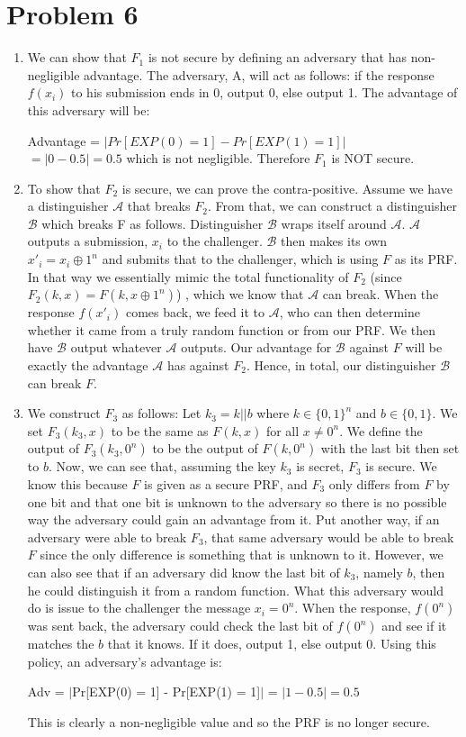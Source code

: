 \documentclass{article}
\begin{document}
\section*{Problem 6}
\begin{enumerate}
\item %
We can show that $F_1$ is not secure by defining an adversary that has non-negligible advantage. The adversary, A, will act as follows: if the response $f(x_i)$ to his submission ends in 0, output 0, else output 1. The advantage of this adversary will be:

Advantage = $|Pr[EXP(0) = 1] - Pr[EXP(1) = 1]|$
\\
$= |0 - 0.5| = 0.5$ which is not negligible. Therefore $F_1$ is NOT secure.

\item %
To show that $F_2$ is secure, we can prove the contra-positive. Assume we have a distinguisher $\mathcal{A}$ that breaks $F_2$. From that, we can construct a distinguisher $\mathcal{B}$ which breaks F as follows. Distinguisher $\mathcal{B}$ wraps itself around $\mathcal{A}$. $\mathcal{A}$ outputs a submission, $x_i$ to the challenger. $\mathcal{B}$ then makes its own $x'_i = x_i \oplus 1^n$ and submits that to the challenger, which is using $F$ as its PRF. In that way we essentially mimic the total functionality of $F_2$ (since $F_2(k, x) = F(k, x\oplus1^n)$) , which we know that $\mathcal{A}$ can break. When the response $f(x'_i)$ comes back, we feed it to $\mathcal{A}$, who can then determine whether it came from a truly random function or from our PRF. We then have $\mathcal{B}$ output whatever $\mathcal{A}$ outputs. Our advantage for $\mathcal{B}$ against $F$ will be exactly the advantage $\mathcal{A}$ has against $F_2$. Hence, in total, our distinguisher $\mathcal{B}$ can break $F$.
\item %
We construct $F_3$ as follows: Let $k_3 = k||b$ where $k \in \{0, 1\}^n$ and $b \in \{0, 1\}$. We set $F_3(k_3, x)$ to be the same as $F(k, x)$ for all $x \neq 0^n$. We define the output of $F_3 (k_3, 0^n)$ to be the output of $F(k, 0^n)$ with the last bit then set to $b$. 
Now, we can see that, assuming the key $k_3$ is secret, $F_3$ is secure. We know this because $F$ is given as a secure PRF, and $F_3$ only differs from $F$ by one bit and that one bit is unknown to the adversary so there is no possible way the adversary could gain an advantage from it. Put another way, if an adversary were able to break $F_3$, that same adversary would be able to break $F$ since the only difference is something that is unknown to it.
However, we can also see that if an adversary did know the last bit of $k_3$, namely $b$, then he could distinguish it from a random function. What this adversary would do is issue to the challenger the message $x_i = 0^n$. When the response, $f(0^n)$ was sent back, the adversary could check the last bit of $f(0^n)$ and see if it matches the $b$ that it knows. If it does, output 1, else output 0. Using this policy, an adversary's advantage is:

Adv = $|$Pr[EXP(0) = 1] - Pr[EXP(1) = 1]$|$ = $| 1 - 0.5 | = 0.5$

This is clearly a non-negligible value and so the PRF is no longer secure.
 
\end{enumerate}
\end{document}
